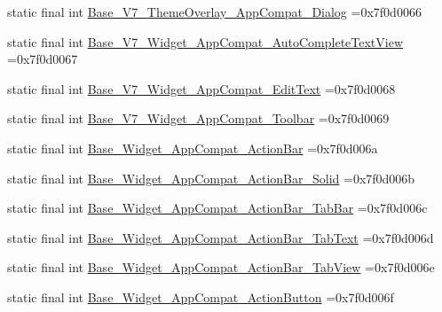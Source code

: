 \begin{DoxyCompactItemize}
\item 
static final int \mbox{\hyperlink{classcom_1_1example_1_1trainawearapplication_1_1_r_1_1style_aff92a2336e0dd8bf6335d644c1872b82}{Base\+\_\+\+V7\+\_\+\+Theme\+Overlay\+\_\+\+App\+Compat\+\_\+\+Dialog}} =0x7f0d0066
\item 
static final int \mbox{\hyperlink{classcom_1_1example_1_1trainawearapplication_1_1_r_1_1style_a13faa1745981ee8fc52344926802fc47}{Base\+\_\+\+V7\+\_\+\+Widget\+\_\+\+App\+Compat\+\_\+\+Auto\+Complete\+Text\+View}} =0x7f0d0067
\item 
static final int \mbox{\hyperlink{classcom_1_1example_1_1trainawearapplication_1_1_r_1_1style_ad0b43cf0def2079e4bb9b074207ebc0d}{Base\+\_\+\+V7\+\_\+\+Widget\+\_\+\+App\+Compat\+\_\+\+Edit\+Text}} =0x7f0d0068
\item 
static final int \mbox{\hyperlink{classcom_1_1example_1_1trainawearapplication_1_1_r_1_1style_a71c84d2a7c19a54e609c8663346d5b7d}{Base\+\_\+\+V7\+\_\+\+Widget\+\_\+\+App\+Compat\+\_\+\+Toolbar}} =0x7f0d0069
\item 
static final int \mbox{\hyperlink{classcom_1_1example_1_1trainawearapplication_1_1_r_1_1style_a8e67c16d75a18b9e871ec285af4c76f4}{Base\+\_\+\+Widget\+\_\+\+App\+Compat\+\_\+\+Action\+Bar}} =0x7f0d006a
\item 
static final int \mbox{\hyperlink{classcom_1_1example_1_1trainawearapplication_1_1_r_1_1style_a9be92da56ea8e00627eade090a11b3f8}{Base\+\_\+\+Widget\+\_\+\+App\+Compat\+\_\+\+Action\+Bar\+\_\+\+Solid}} =0x7f0d006b
\item 
static final int \mbox{\hyperlink{classcom_1_1example_1_1trainawearapplication_1_1_r_1_1style_a9474f021ec12bf17c7e13d41650ff240}{Base\+\_\+\+Widget\+\_\+\+App\+Compat\+\_\+\+Action\+Bar\+\_\+\+Tab\+Bar}} =0x7f0d006c
\item 
static final int \mbox{\hyperlink{classcom_1_1example_1_1trainawearapplication_1_1_r_1_1style_af60ac5f4f621aac5a18f33f3c890842f}{Base\+\_\+\+Widget\+\_\+\+App\+Compat\+\_\+\+Action\+Bar\+\_\+\+Tab\+Text}} =0x7f0d006d
\item 
static final int \mbox{\hyperlink{classcom_1_1example_1_1trainawearapplication_1_1_r_1_1style_a2c3fcfa41b83eadfde127e32b3ebe0c3}{Base\+\_\+\+Widget\+\_\+\+App\+Compat\+\_\+\+Action\+Bar\+\_\+\+Tab\+View}} =0x7f0d006e
\item 
static final int \mbox{\hyperlink{classcom_1_1example_1_1trainawearapplication_1_1_r_1_1style_ac949ef63fb42023773a840d8ab26ad2b}{Base\+\_\+\+Widget\+\_\+\+App\+Compat\+\_\+\+Action\+Button}} =0x7f0d006f
\item 

\end{DoxyCompactItemize}
